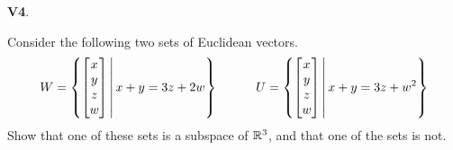 \documentclass{article}
\newenvironment{problem}[1]
{
  \begin{flushleft}
  \textbf{#1}.
  \ignorespaces
}
{
  \end{flushleft}
}
\begin{document}
\begin{problem}{V4}
Consider the following two sets of Euclidean vectors.
\[
  W = \left\{\begin{bmatrix} x \\ y \\ z \\ w \end{bmatrix} \,\middle|\,x+y=3z+2w\right\}
\hspace{3em}
  U = \left\{\begin{bmatrix} x \\ y \\ z \\ w \end{bmatrix}\,\middle|\,x+y=3z+w^2\right\}
\]
Show that one of these sets is a subspace of \(\mathbb{R}^3\), and
that one of the sets is not.
\end{problem}
\end{document}
